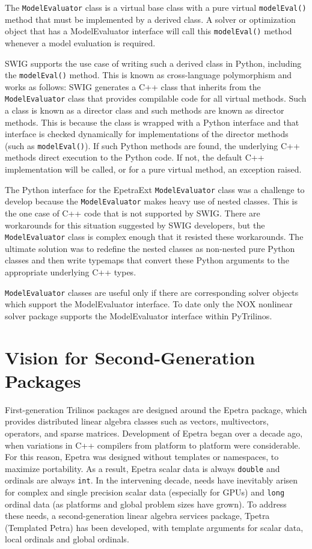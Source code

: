 \documentclass[11pt]{article}
\begin{document}
The {\tt ModelEvaluator} class is a virtual base class with a pure virtual {\tt modelEval()} method that must be implemented by a derived class.  A solver or optimization object that has a ModelEvaluator interface will call this {\tt modelEval()} method whenever a model evaluation is required.

SWIG supports the use case of writing such a derived class in Python, including the {\tt modelEval()} method.  This is known as cross-language polymorphism and works as follows:  SWIG generates a C++ class that inherits from the {\tt ModelEvaluator} class that provides compilable code for all virtual methods.  Such a class is known as a director class and such methods are known as director methods.  This is because the class is wrapped with a Python interface and that interface is checked dynamically for implementations of the director methods (such as {\tt modelEval()}).  If such Python methods are found, the underlying C++ methods direct execution to the Python code.  If not, the default C++ implementation will be called, or for a pure virtual method, an exception raised.

The Python interface for the EpetraExt {\tt ModelEvaluator} class was a challenge to develop because the {\tt ModelEvaluator} makes heavy use of nested classes.  This is the one case of C++ code that is not supported by SWIG.  There are workarounds for this situation suggested by SWIG developers, but the {\tt ModelEvaluator} class is complex enough that it resisted these workarounds.  The ultimate solution was to redefine the nested classes as non-nested pure Python classes and then write typemaps that convert these Python arguments to the appropriate underlying C++ types.

{\tt ModelEvaluator} classes are useful only if there are corresponding solver objects which support the ModelEvaluator interface.  To date only the NOX nonlinear solver package supports the ModelEvaluator interface within PyTrilinos.

\section{Vision for Second-Generation Packages}
\label{sec:vision}

First-generation Trilinos packages are designed around the Epetra package, which provides distributed linear algebra classes such as vectors, multivectors, operators, and sparse matrices.  Development of Epetra began over a decade ago, when variations in C++ compilers from platform to platform were considerable.  For this reason, Epetra was designed without templates or namespaces, to maximize portability.  As a result, Epetra scalar data is always {\tt double} and ordinals are always {\tt int}.  In the intervening decade, needs have inevitably arisen for complex and single precision scalar data (especially for GPUs) and {\tt long} ordinal data (as platforms and global problem sizes have grown).  To address these needs, a second-generation linear algebra services package, Tpetra (Templated Petra) has been developed, with template arguments for scalar data, local ordinals and global ordinals.
\end{document}
